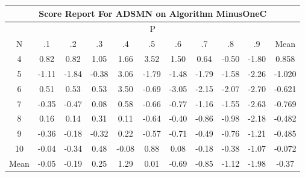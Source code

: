 \documentclass[11pt,a4paper]{report}
\begin{document}
\begin{longtable}{ | c || c | c | c | c | c | c | c | c | c || c |}
\hline
\multicolumn{11}{|c|}{ Score Report For ADSMN on Algorithm MinusOneC} \\
\hline
\multicolumn{11}{|c|}{ P } \\
\hline
N & .1 & .2 & .3 & .4 & .5 & .6 & .7 & .8 & .9 & Mean\\
 \hline
 \hline
 \endhead
  4 &  \cellcolor[HTML]{E7E7FF} 0.82 &  \cellcolor[HTML]{E7E7FF} 0.82 &  \cellcolor[HTML]{E7E7FF} 1.05 &  \cellcolor[HTML]{D7D7FF} 1.66 &  \cellcolor[HTML]{A7A7FF} 3.52 &  \cellcolor[HTML]{D7D7FF} 1.50 &  \cellcolor[HTML]{EFEFFF} 0.64 &  \cellcolor[HTML]{FFEFEF} -0.50 &  \cellcolor[HTML]{FFCFCF} -1.80 & 0.858 \\
  5 &  \cellcolor[HTML]{FFDFDF} -1.11 &  \cellcolor[HTML]{FFCFCF} -1.84 &  \cellcolor[HTML]{FFF7F7} -0.38 &  \cellcolor[HTML]{AFAFFF} 3.06 &  \cellcolor[HTML]{FFCFCF} -1.79 &  \cellcolor[HTML]{FFD7D7} -1.48 &  \cellcolor[HTML]{FFCFCF} -1.79 &  \cellcolor[HTML]{FFD7D7} -1.58 &  \cellcolor[HTML]{FFC7C7} -2.26 & -1.020 \\
  6 &  \cellcolor[HTML]{EFEFFF} 0.51 &  \cellcolor[HTML]{EFEFFF} 0.53 &  \cellcolor[HTML]{EFEFFF} 0.53 &  \cellcolor[HTML]{A7A7FF} 3.50 &  \cellcolor[HTML]{FFEFEF} -0.69 &  \cellcolor[HTML]{FFAFAF} -3.05 &  \cellcolor[HTML]{FFC7C7} -2.15 &  \cellcolor[HTML]{FFC7C7} -2.07 &  \cellcolor[HTML]{FFB7B7} -2.70 & -0.621 \\
  7 &  \cellcolor[HTML]{FFF7F7} -0.35 &  \cellcolor[HTML]{FFF7F7} -0.47 &  \cellcolor[HTML]{FFFFFF} 0.08 &  \cellcolor[HTML]{EFEFFF} 0.58 &  \cellcolor[HTML]{FFEFEF} -0.66 &  \cellcolor[HTML]{FFEFEF} -0.77 &  \cellcolor[HTML]{FFDFDF} -1.16 &  \cellcolor[HTML]{FFD7D7} -1.55 &  \cellcolor[HTML]{FFBFBF} -2.63 & -0.769 \\
  8 &  \cellcolor[HTML]{FFFFFF} 0.16 &  \cellcolor[HTML]{FFFFFF} 0.14 &  \cellcolor[HTML]{F7F7FF} 0.31 &  \cellcolor[HTML]{FFFFFF} 0.11 &  \cellcolor[HTML]{FFEFEF} -0.64 &  \cellcolor[HTML]{FFF7F7} -0.40 &  \cellcolor[HTML]{FFE7E7} -0.86 &  \cellcolor[HTML]{FFE7E7} -0.98 &  \cellcolor[HTML]{FFC7C7} -2.18 & -0.482 \\
  9 &  \cellcolor[HTML]{FFF7F7} -0.36 &  \cellcolor[HTML]{FFF7F7} -0.18 &  \cellcolor[HTML]{FFF7F7} -0.32 &  \cellcolor[HTML]{F7F7FF} 0.22 &  \cellcolor[HTML]{FFEFEF} -0.57 &  \cellcolor[HTML]{FFEFEF} -0.71 &  \cellcolor[HTML]{FFEFEF} -0.49 &  \cellcolor[HTML]{FFEFEF} -0.76 &  \cellcolor[HTML]{FFDFDF} -1.21 & -0.485 \\
  10 &  \cellcolor[HTML]{FFFFFF} -0.04 &  \cellcolor[HTML]{FFF7F7} -0.34 &  \cellcolor[HTML]{EFEFFF} 0.48 &  \cellcolor[HTML]{FFFFFF} -0.08 &  \cellcolor[HTML]{E7E7FF} 0.88 &  \cellcolor[HTML]{FFFFFF} 0.08 &  \cellcolor[HTML]{FFF7F7} -0.18 &  \cellcolor[HTML]{FFF7F7} -0.38 &  \cellcolor[HTML]{FFE7E7} -1.07 & -0.072 \\
 \hline
 \hline
Mean &  \cellcolor[HTML]{FFFFFF} -0.05 &  \cellcolor[HTML]{FFF7F7} -0.19 &  \cellcolor[HTML]{F7F7FF} 0.25 &  \cellcolor[HTML]{DFDFFF} 1.29 &  \cellcolor[HTML]{FFFFFF} 0.01 &  \cellcolor[HTML]{FFEFEF} -0.69 &  \cellcolor[HTML]{FFE7E7} -0.85 &  \cellcolor[HTML]{FFDFDF} -1.12 &  \cellcolor[HTML]{FFCFCF} -1.98 &  \cellcolor[HTML]{FFF7F7} -0.37
\end{longtable}
\end{document}
